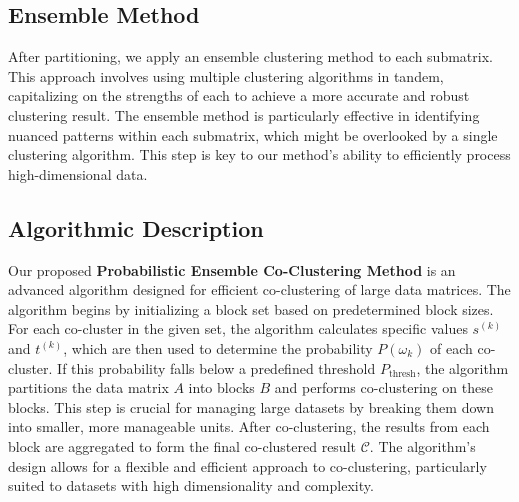 \subsection{Ensemble Method}
After partitioning, we apply an ensemble clustering method to each submatrix. This approach involves using multiple clustering algorithms in tandem, capitalizing on the strengths of each to achieve a more accurate and robust clustering result. The ensemble method is particularly effective in identifying nuanced patterns within each submatrix, which might be overlooked by a single clustering algorithm. This step is key to our method's ability to efficiently process high-dimensional data.

\subsection{Algorithmic Description}
Our proposed \textbf{Probabilistic Ensemble Co-Clustering Method} is an advanced algorithm designed for efficient co-clustering of large data matrices. The algorithm begins by initializing a block set based on predetermined block sizes. For each co-cluster in the given set, the algorithm calculates specific values $s^{(k)}$ and $t^{(k)}$, which are then used to determine the probability $P(\omega_k)$ of each co-cluster. If this probability falls below a predefined threshold $P_{\text{thresh}}$, the algorithm partitions the data matrix $A$ into blocks $B$ and performs co-clustering on these blocks. This step is crucial for managing large datasets by breaking them down into smaller, more manageable units. After co-clustering, the results from each block are aggregated to form the final co-clustered result $\mathcal{C}$. The algorithm's design allows for a flexible and efficient approach to co-clustering, particularly suited to datasets with high dimensionality and complexity.




